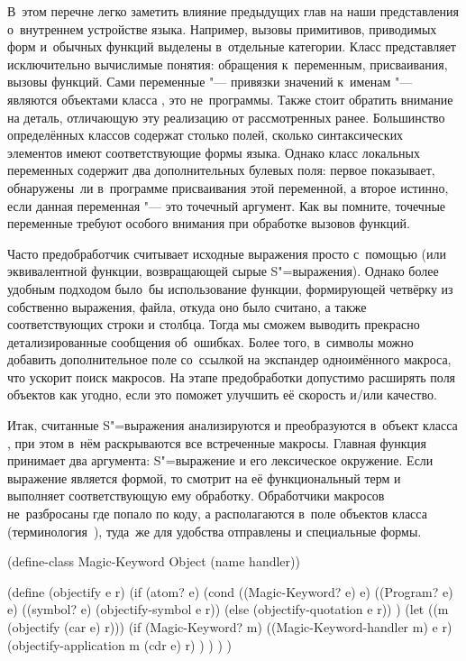 В~этом перечне легко заметить влияние предыдущих глав на наши представления
о~внутреннем устройстве языка. Например, вызовы примитивов, приводимых форм
 и~обычных функций выделены в~отдельные
категории. Класс  представляет исключительно вычислимые понятия:
обращения к~переменным, присваивания, вызовы функций. Сами переменные "---
привязки значений к~именам "--- являются объектами класса , это
не~программы. Также стоит обратить внимание на деталь, отличающую эту реализацию
от рассмотренных ранее. Большинство определённых классов содержат столько полей,
сколько синтаксических элементов имеют соответствующие формы языка. Однако класс
локальных переменных содержит два дополнительных булевых поля: первое
показывает, обнаружены~ли в~программе присваивания этой переменной, а второе
истинно, если данная переменная "--- это точечный аргумент. Как вы помните,
точечные переменные требуют особого внимания при обработке вызовов функций.

Часто предобработчик считывает исходные выражения просто с~помощью 
(или эквивалентной функции, возвращающей сырые S"=выражения). Однако более
удобным подходом было~бы использование функции, формирующей четвёрку из
собственно выражения, файла, откуда оно было считано, а также соответствующих
строки и столбца. Тогда мы сможем выводить прекрасно детализированные сообщения
об~ошибках. Более того, в~символы можно добавить дополнительное поле со~ссылкой
на экспандер одноимённого макроса, что ускорит поиск макросов. На этапе
предобработки допустимо расширять поля объектов как угодно, если это поможет
улучшить её скорость \hbox{и/или} качество.

Итак, считанные S"=выражения анализируются и преобразуются в~объект класса
, при этом в~нём раскрываются все встреченные макросы. Главная
функция  принимает два аргумента: S"=выражение и его лексическое
окружение. Если выражение является формой, то  смотрит на её
функциональный терм и выполняет соответствующую ему обработку. Обработчики
макросов не~разбросаны где попало по коду, а располагаются в~поле 
объектов класса  (терминология~\cite{ss75}), туда~же для
удобства отправлены и специальные формы.

\begin{code:lisp}[label=macros/macrosystem/object/src:objectify]
(define-class Magic-Keyword Object (name handler))

(define (objectify e r)
  (if (atom? e)
      (cond ((Magic-Keyword? e) e)
            ((Program? e)       e)
            ((symbol? e)        (objectify-symbol e r))
            (else               (objectify-quotation e r)) )
      (let ((m (objectify (car e) r)))
        (if (Magic-Keyword? m)
            ((Magic-Keyword-handler m) e r)
            (objectify-application m (cdr e) r) ) ) ) )
\end{code:lisp}

